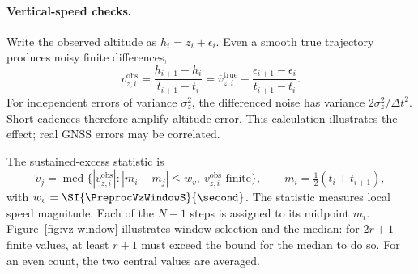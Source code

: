 \begin{revblock}
\paragraph{Vertical-speed checks.}
Write the observed altitude as $h_i=z_i+\epsilon_i$. Even a smooth true trajectory
produces noisy finite differences,
\begin{equation}
 v_{z,i}^{\mathrm{obs}}=\frac{h_{i+1}-h_i}{t_{i+1}-t_i}
 =\overline v_{z,i}^{\mathrm{true}}+
   \frac{\epsilon_{i+1}-\epsilon_i}{t_{i+1}-t_i}.
 \label{eq:altitude-difference-noise}
\end{equation}
For independent errors of variance $\sigma_z^2$, the differenced noise has variance
$2\sigma_z^2/\Delta t^2$. Short cadences therefore amplify altitude error.
This calculation illustrates the effect; real GNSS errors may be correlated.

The sustained-excess statistic is
\begin{equation}
\label{eq:vzlocal}
 \tilde v_j=\operatorname{med}\{ |v_{z,i}^{\mathrm{obs}}|:
       |m_i-m_j|\le w_v,\ v_{z,i}^{\mathrm{obs}}\text{ finite}\},\qquad
 m_i=\tfrac12(t_i+t_{i+1}),
\end{equation}
with $w_v=\SI{\PreprocVzWindowS}{\second}$. The statistic measures local speed
magnitude. Each of the $N-1$ steps is assigned
to its midpoint $m_i$. Figure~\ref{fig:vz-window} illustrates window selection and
the median: for $2r+1$ finite values, at least $r+1$ must exceed the bound for the
median to do so. For an even count, the two central values are averaged.


\end{revblock}
